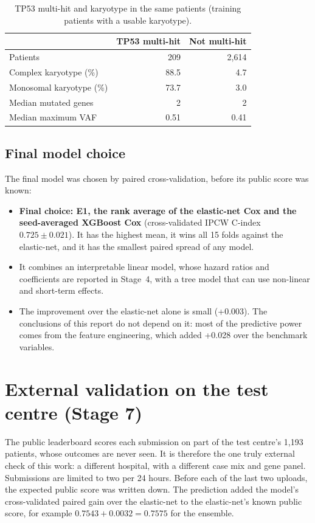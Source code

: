 \documentclass[11pt,a4paper]{article}
\begin{document}
\begin{table}[H]
\centering
\caption{TP53 multi-hit and karyotype in the same patients (training patients with a
usable karyotype).}
\label{tab:tp53co}
\begin{tabular}{lrr}
\toprule
 & TP53 multi-hit & Not multi-hit \\
\midrule
Patients                   & 209  & 2{,}614 \\
Complex karyotype (\%)     & 88.5 & 4.7 \\
Monosomal karyotype (\%)   & 73.7 & 3.0 \\
Median mutated genes       & 2    & 2 \\
Median maximum VAF         & 0.51 & 0.41 \\
\bottomrule
\end{tabular}
\end{table}

\subsection{Final model choice}
The final model was chosen by paired cross-validation, before its public score was known:
\begin{itemize}
  \item \textbf{Final choice: E1, the rank average of the elastic-net Cox and the
        seed-averaged XGBoost Cox} (cross-validated IPCW C-index $0.725 \pm 0.021$). It has
        the highest mean, it wins all 15 folds against the elastic-net, and it has the
        smallest paired spread of any model.
  \item It combines an interpretable linear model, whose hazard ratios and coefficients are
        reported in Stage~4, with a tree model that can use non-linear and short-term
        effects.
  \item The improvement over the elastic-net alone is small (+0.003). The conclusions of
        this report do not depend on it: most of the predictive power comes from the
        feature engineering, which added +0.028 over the benchmark variables.
\end{itemize}

\section{External validation on the test centre (Stage 7)}
\label{sec:external}
The public leaderboard scores each submission on part of the test centre's 1{,}193
patients, whose outcomes are never seen. It is therefore the one truly external check of
this work: a different hospital, with a different case mix and gene panel. Submissions
are limited to two per 24 hours. Before each of the last two uploads, the expected public
score was written down. The prediction added the model's cross-validated paired gain over
the elastic-net to the elastic-net's known public score, for example
$0.7543 + 0.0032 = 0.7575$ for the ensemble.
\end{document}
